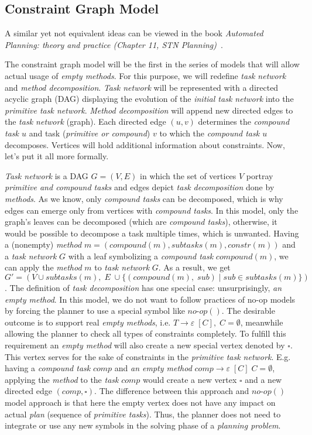 \subsection{Constraint Graph Model}

\medskip\noindent
A similar yet not equivalent ideas can be viewed in the book \emph{Automated Planning: theory and practice (Chapter 11, STN Planning)}~\cite{nau}.

\medskip\noindent
The constraint graph model will be the first in the series of models that will allow actual usage of \emph{empty methods}. For this purpose, we will redefine \emph{task network} and \emph{method decomposition}. \emph{Task network} will be represented with a directed acyclic graph (DAG) displaying the evolution of the \emph{initial task network} into the \emph{primitive task network}. \emph{Method decomposition} will append new directed edges to the \emph{task network} (graph). Each directed edge $(u,v)$ determines the \emph{compound task $u$} and task (\emph{primitive or compound}) $v$ to which the \emph{compound task $u$} decomposes. Vertices will hold additional information about constraints. Now, let's put it all more formally.

\medskip\noindent
\emph{Task network} is a DAG $G = (V, E)$ in which the set of vertices $V$ portray \emph{primitive and compound tasks} and edges depict \emph{task decomposition} done by \emph{methods}. As we know, only \emph{compound tasks} can be decomposed, which is why edges can emerge only from vertices with \emph{compound tasks}. In this model, only the graph's leaves can be decomposed (which are \emph{compound tasks}), otherwise, it would be possible to decompose a task multiple times, which is unwanted. Having a (nonempty) \emph{method} $m = (compound(m), subtasks(m), constr(m))$ and a \emph{task network} $G$ with a leaf symbolizing a \emph{compound task} $compound(m)$, we can apply the \emph{method} $m$ to \emph{task network} $G$. As a result, we get $G' = (V \cup subtasks(m), \; E \; \cup \{(compound(m), \;sub) \; | \; sub \in subtasks(m)\})$. The definition of \emph{task decomposition} has one special case: unsurprisingly, \emph{an empty method}. In this model, we do not want to follow practices of no-op models by forcing the planner to use a special symbol like $no\text{-}op()$. The desirable outcome is to support real \emph{empty methods}, i.e. $T \rightarrow \varepsilon \; [C], \; C = \emptyset$, meanwhile allowing the planner to check all types of constraints completely. To fulfill this requirement an \emph{empty method} will also create a new special vertex denoted by $\square$. This vertex serves for the sake of constraints in the \emph{primitive task network}. E.g. having a \emph{compound task} $comp$ and \emph{an empty method} $comp \rightarrow \varepsilon \; [C] \; C = \emptyset$, applying the \emph{method} to the \emph{task} $comp$ would create a new vertex $\square$ and a new directed edge $(comp, \square)$. The difference between this approach and $no\text{-}op()$ model approach is that here the empty vertex does not have any impact on actual \emph{plan} (sequence of \emph{primitive tasks}). Thus, the planner does not need to integrate or use any new symbols in the solving phase of a \emph{planning problem}. 

